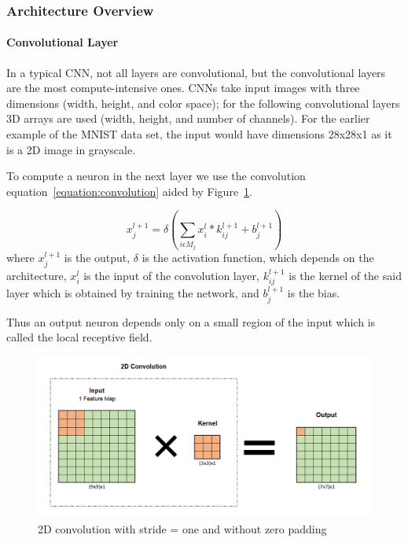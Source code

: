  \subsubsection{Architecture Overview}
 \label{section:Aoverview}


 \paragraph{Convolutional Layer}
\label{section:convlayer}

In a typical CNN, not all layers are convolutional, but the convolutional layers
are the most compute-intensive ones. CNNs take input images with three  dimensions
(width, height, and color space); for the following convolutional layers 3D
arrays are used (width, height, and number of channels). For the earlier example
of the MNIST data set, the input would have dimensions 28x28x1 as it is a 2D
image in grayscale.

To compute a neuron in the next layer we use the convolution
equation~\ref{equation:convolution} aided by Figure~\ref{Cl}.

\begin{equation} \label{equation:convolution}
    \displaystyle x_{j}^{l+1}=\delta (\sum_{i \epsilon M_{j}}x_{i}^{l} * k_{ij}^{l+1}+ b_{j}^{l+1})
\end{equation}
where $x_{j}^{l+1}$ is the output, $\delta$ is the activation function, which
depends on the architecture, $x_{i}^{l}$ is the input of the convolution layer,
$k_{ij}^{l+1}$ is the kernel of the said layer which is obtained by training the
network, and $b_{j}^{l+1}$ is the bias.

Thus an output neuron depends only on a small region of the input which is
called the local receptive field.

\begin{figure}[!htbp]
    \centering
    \includegraphics[width=1\textwidth]{Figures/conv.png}
    \caption{2D convolution with stride = one and without zero padding}
    \label{Cl}
\end{figure} 

